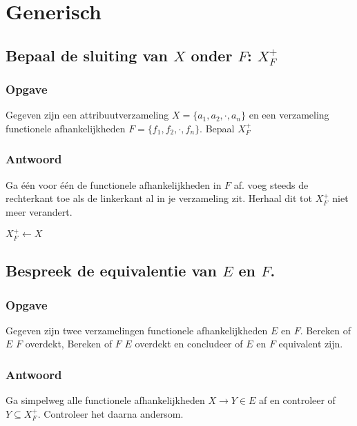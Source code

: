 \documentclass[normaalvormen.tex]{subfiles}
\begin{document}
\chapter{Generisch}
\renewcommand\thesection{V\arabic{section}}
\renewcommand\thesubsection{V\arabic{section}}

\section{Bepaal de sluiting van $X$ onder $F$: $X_{F}^{+}$}
\subsection*{Opgave}
Gegeven zijn een attribuutverzameling $X = \{a_1,a_2,\cdot,a_n\}$ en een verzameling functionele afhankelijkheden $F=  \{f_1,f_2,\cdot,f_n\}$. Bepaal $X_{F}^{+}$
\subsection*{Antwoord}
Ga \'e\'en voor \'e\'en de functionele afhankelijkheden in $F$ af. voeg steeds de rechterkant toe als de linkerkant al in je verzameling zit. Herhaal dit tot $X_{F}^{+}$ niet meer verandert.
\begin{mdframed}
\begin{algorithm}[H]
$X_{F}^{+} \leftarrow X$\\
\end{algorithm}
\end{mdframed}


\section{Bespreek de equivalentie van $E$ en $F$.}
\subsection*{Opgave}
Gegeven zijn twee verzamelingen functionele afhankelijkheden $E$ en $F$. Bereken of $E$ $F$ overdekt, Bereken of $F$ $E$ overdekt en concludeer of $E$ en $F$ equivalent zijn.
\subsection*{Antwoord}
Ga simpelweg alle functionele afhankelijkheden $X\rightarrow Y \in E$ af en controleer of $Y \subseteq X_{F}^{+}$. Controleer het daarna andersom.
\begin{mdframed}
\begin{algorithm}[H]
\end{algorithm}
\end{mdframed}
\end{document}
